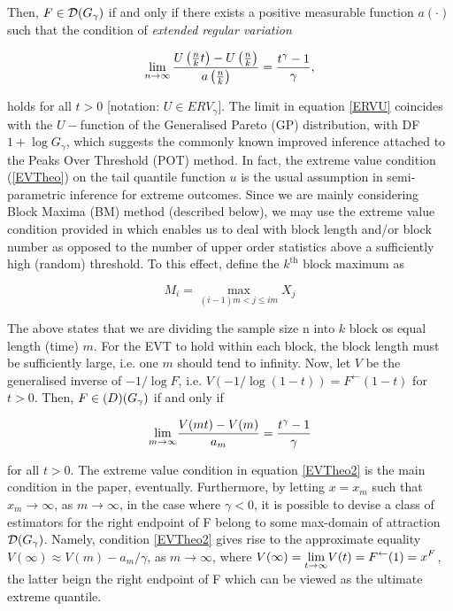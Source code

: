 Then, $F\in {\ensuremath{\mathcal{D}}}(G_{\gamma})$ if and only if there exists a positive  measurable function $a(\cdot)$ such that the condition of \emph{extended regular variation}


\begin{equation}\label{ERVU}
	\displaystyle {\lim_{n \rightarrow{\infty}}}\,\frac{U\left(\frac{n}{k}t\right)-U\left(\frac{n}{k}\right)}{a\left(\frac{n}{k}\right)}= \frac{t^{\gamma}-1}{\gamma},
\end{equation}


holds for all $t>0$ [notation: $U\in ERV_{\gamma}$]. The limit in equation \ref{ERVU} coincides with the $U-$function of the Generalised Pareto (GP) distribution, with DF $ 1+ \log G_ \gamma $, which suggests the commonly known improved inference attached to the Peaks Over Threshold (POT) method. In fact, the extreme value condition (\ref{EVTheo}) on the tail quantile function $ u $ is the usual assumption in semi-parametric inference for extreme outcomes. Since we are mainly considering Block Maxima (BM) method (described below), we may use the extreme value condition provided in \citet{FdeH:15} which enables us to deal with block length and/or block number as opposed to the number of upper order statistics above a sufficiently high (random) threshold. To this effect, define the $ k^{\text{th}} $ block maximum as 

\begin{equation}
M_i = \max _{(i -1) m < j \le i m} X_j
\end{equation}

The above states that we are dividing the sample size n into $k$ block os equal length (time) $m$. For the EVT to hold within each block, the block length must be sufficiently large, i.e. one $m$ should tend to infinity. Now, let $V$ be the generalised inverse of $ -1/\log F $, i.e. $ V(-1 / \log( 1 - t ) ) = F^{\leftarrow}( 1 - t )$ for $ t > 0 $. Then, $F \in {\ensuremath{\mathcal{(}}}D) ( G_\gamma )$ if and only if


\begin{equation} \label{EVTheo2}
\displaystyle {\lim_{m \rightarrow{\infty}}} \frac{V(mt) - V(m)}{a_m} = \frac{t^\gamma - 1}{\gamma}
\end{equation}

\noindent for all $ t > 0 $. The extreme value condition in equation \ref{EVTheo2} is the main condition in the paper, eventually. Furthermore, by letting $ x = x_m $ such that $ x_m \rightarrow \infty $, as $ m \rightarrow \infty $, in the case where $ \gamma < 0 $, it is possible to devise a class of estimators for the right endpoint of F belong to some max-domain of attraction $ {\mathcal{D}} (G_\gamma) $.  Namely, condition \ref{EVTheo2} gives rise to the approximate equality $ V(\infty) \approx V(m) - a_m / \gamma $, as $ m \rightarrow \infty $, where $ V(\infty ) = \displaystyle {\lim_{t \rightarrow{\infty}}} V(t) = F^{\leftarrow}(1) = x^F $, the latter beign the right endpoint of F which can be viewed as the ultimate extreme quantile.


